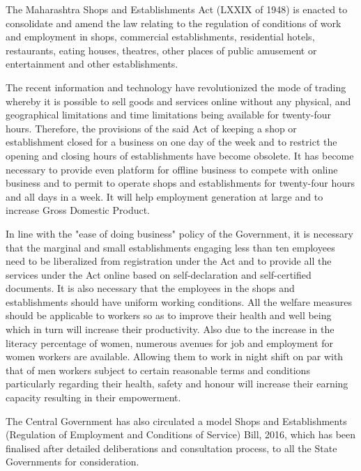 \documentclass[billwithdocket]{mhact}
\begin{document}
\begin{sor}
\item The Maharashtra Shops and Establishments Act (LXXIX of 1948) is
  enacted to consolidate and amend the law relating to the regulation
  of conditions of work and employment in shops, commercial
  establishments, residential hotels, restaurants, eating houses,
  theatres, other places of public amusement or entertainment and
  other establishments.

\item The recent information and technology have revolutionized the
  mode of trading whereby it is possible to sell goods and services
  online without any physical, and geographical limitations and time
  limitations being available for twenty-four hours. Therefore, the
  provisions of the said Act of keeping a shop or establishment closed
  for a business on one day of the week and to restrict the opening
  and closing hours of establishments have become obsolete.  It has
  become necessary to provide even platform for offline business to
  compete with online business and to permit to operate shops and
  establishments for twenty-four hours and all days in a week. It will
  help employment generation at large and to increase Gross Domestic
  Product.

\item In line with the "ease of doing business" policy of the
  Government, it is necessary that the marginal and small
  establishments engaging less than ten employees need to be
  liberalized from registration under the Act and to provide all the
  services under the Act online based on self-declaration and
  self-certified documents.  It is also necessary that the employees
  in the shops and establishments should have uniform working
  conditions. All the welfare measures should be applicable to workers
  so as to improve their health and well being which in turn will
  increase their productivity. Also due to the increase in the
  literacy percentage of women, numerous avenues for job and
  employment for women workers are available. Allowing them to work in
  night shift on par with that of men workers subject to certain
  reasonable terms and conditions particularly regarding their health,
  safety and honour will increase their earning capacity resulting in
  their empowerment.

\item The Central Government has also circulated a model Shops and
  Establishments (Regulation of Employment and Conditions of Service)
  Bill, 2016, which has been finalised after detailed deliberations
  and consultation process, to all the State Governments for
  consideration.


\end{sor}
\end{document}
